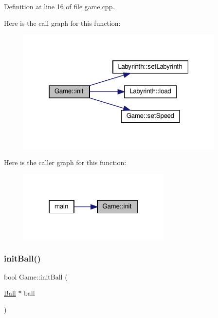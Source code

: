 Definition at line 16 of file game.\+cpp.

Here is the call graph for this function\+:
\nopagebreak
\begin{figure}[H]
\begin{center}
\leavevmode
\includegraphics[width=294pt]{class_game_a66e1800ff072c0b4e737ac51430630db_cgraph}
\end{center}
\end{figure}
Here is the caller graph for this function\+:
\nopagebreak
\begin{figure}[H]
\begin{center}
\leavevmode
\includegraphics[width=216pt]{class_game_a66e1800ff072c0b4e737ac51430630db_icgraph}
\end{center}
\end{figure}
\mbox{\label{class_game_a3702238c3fef205d19d1cb4bbc471c5c}} 
\subsubsection{\texorpdfstring{initBall()}{initBall()}}
{\footnotesize\ttfamily bool Game\+::init\+Ball (\begin{DoxyParamCaption}\item[{\mbox{\hyperlink{class_ball}{Ball}} $\ast$}]{ball }\end{DoxyParamCaption})\hspace{0.3cm}{\ttfamily [private]}}

